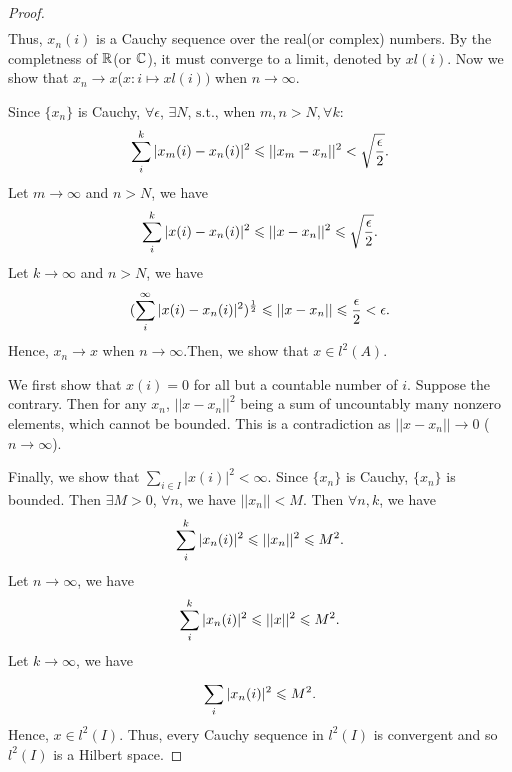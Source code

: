 \begin{proof}
\begin{align*}
    \end{align*}
    Thus, $x_n(i)$ is a Cauchy sequence over the real(or complex) numbers. By the completness of $\mathbb{R}$(or $\mathbb{C}$), it must converge to a limit, denoted by $xl(i)$.
    Now we show that $x_n\rightarrow x$($x:i\mapsto xl(i))$ when $n\rightarrow \infty$. 
    \par
    Since $\{x_n\}$ is Cauchy, $\forall \epsilon$, $\exists N$, $\mathrm{s.t.}$, when $m,n>N, \forall k: $
    \begin{align*}
        \sum\limits_{i}^{k}|x_m(i)-x_n(i)|^2\leqslant ||x_m-x_n||^2<\sqrt{\frac{\epsilon}{2}}.
    \end{align*} 
    Let $m\rightarrow \infty$ and $n>N$, we have
    \begin{align*}
        \sum\limits_{i}^{k}|x(i)-x_n(i)|^2\leqslant ||x-x_n||^2\leqslant\sqrt{\frac{\epsilon}{2}}.
    \end{align*}
    Let $k\rightarrow \infty$ and $n>N$, we have
    \begin{align*}
        (\sum\limits_{i}^{\infty}|x(i)-x_n(i)|^2)^{\frac{1}{2}}\leqslant ||x-x_n||\leqslant\frac{\epsilon}{2}<\epsilon.
    \end{align*}
    Hence, $x_n\rightarrow x$ when $n\rightarrow \infty$.Then, we show that $x\in l^2(A)$. 
    \par
    We first show that $x(i)=0$ for all but a countable number of $i$. Suppose the contrary. 
    Then for any $x_n$, $||x-x_n||^2$ being a sum of uncountably many nonzero elements, which cannot be bounded. This is a contradiction as $||x-x_n||\rightarrow 0$ ($n\rightarrow \infty$).
    \par
    Finally, we show that $\sum\limits_{i\in I}^{}|x(i)|^2<\infty$. Since $\{x_n\}$ is Cauchy, $\{x_n\}$ is bounded. Then $\exists M>0$, $\forall n$, we have $||x_n||<M$. Then $\forall n,k$, we have
    \begin{align*}
        \sum\limits_{i}^{k}|x_n(i)|^2\leqslant ||x_n||^2\leqslant M^2.
    \end{align*}
    Let $n\rightarrow \infty$, we have
    \begin{align*}
        \sum\limits_{i}^{k}|x_n(i)|^2\leqslant ||x||^2\leqslant M^2.
    \end{align*}
    Let $k\rightarrow \infty$, we have
    \begin{align*}
        \sum\limits_{i}^{}|x_n(i)|^2\leqslant M^2.
    \end{align*}
    Hence, $x\in l^2(I)$.
    Thus, every Cauchy sequence in $l^2(I)$ is convergent and so $l^2(I)$ is a Hilbert space.
\end{proof}

